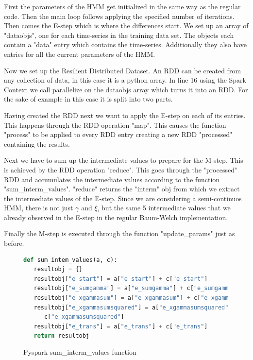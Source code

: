 First the parameters of the HMM get initialized in the same way as the regular code. Then the main loop follows applying the specified number of iterations. Then comes the E-step which is where the differences start. We set up an array of "dataobjs", one for each time-series in the training data set. The objects each contain a "data" entry which contains the time-series. Additionally they also have entries for all the current parameters of the HMM. 

Now we set up the Resilient Distributed Dataset. An RDD can be created from any collection of data, in this case it is a python array. In line 16 using the Spark Context we call parallelize on the dataobjs array which turns it into an RDD. For the sake of example in this case it is split into two parts. 

Having created the RDD next we want to apply the E-step on each of its entries. This happens through the RDD operation "map". This causes the function "process" to be applied to every RDD entry creating a new RDD "processed" containing the results. 

Next we have to sum up the intermediate values to prepare for the M-step. This is achieved by the RDD operation "reduce". This goes through the "processed" RDD and accumulates the intermediate values according to the function "sum\_interm\_values". "reduce" returns the "interm" obj from which we extract the intermediate values of the E-step. Since we are considering a semi-continuos HMM, there is not just $\gamma$ and $\xi$, but the same 5 intermediate values that we already observed in the E-step in the regular Baum-Welch implementation. 

Finally the M-step is executed through the function "update\_params" just as before. 

\begin{figure}
\begin{singlespace}
\begin{lstlisting}[language=Python]
def sum_intem_values(a, c):
   resultobj = {}
   resultobj["e_start"] = a["e_start"] + c["e_start"]
   resultobj["e_sumgamma"] = a["e_sumgamma"] + c["e_sumgamma"]
   resultobj["e_xgammasum"] = a["e_xgammasum"] + c["e_xgammasum"]
   resultobj["e_xgammasumsquared"] = a["e_xgammasumsquared"] + \
      c["e_xgammasumsquared"]
   resultobj["e_trans"] = a["e_trans"] + c["e_trans"]
   return resultobj
\end{lstlisting}
\end{singlespace}
\caption{Pyspark sum\_interm\_values function}    
\label{fig:pyspark-sum-listing}
\end{figure}


